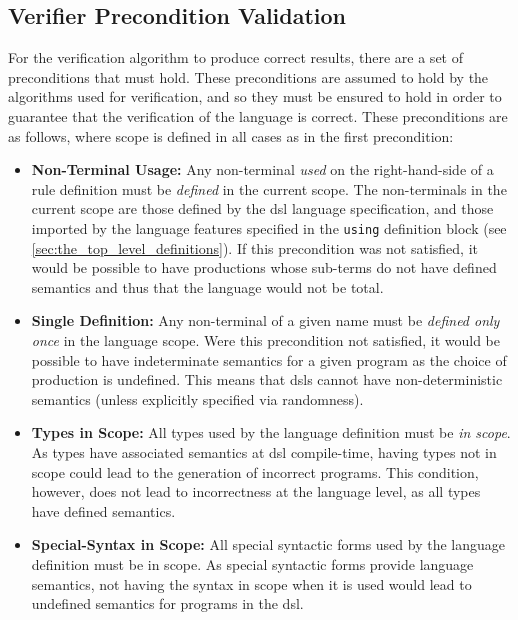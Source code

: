 \subsection{Verifier Precondition Validation} %
\label{sub:verifier_precondition_validation}
For the verification algorithm to produce correct results, there are a set of preconditions that must hold. 
These preconditions are assumed to hold by the algorithms used for verification, and so they must be ensured to hold in order to guarantee that the verification of the language is correct.
These preconditions are as follows, where scope is defined in all cases as in the first precondition:
\begin{itemize}
    \item \label{item:non_terminal_usage} \textbf{Non-Terminal Usage:} Any non-terminal \textit{used} on the right-hand-side of a rule definition must be \textit{defined} in the current scope. 
    The non-terminals in the current scope are those defined by the \gls{dsl} language specification, and those imported by the language features specified in the \texttt{using} definition block (see \autoref{sec:the_top_level_definitions}).
    If this precondition was not satisfied, it would be possible to have productions whose sub-terms do not have defined semantics and thus that the language would not be total. 
    \item \textbf{Single Definition:} Any non-terminal of a given name must be \textit{defined only once} in the language scope.
    Were this precondition not satisfied, it would be possible to have indeterminate semantics for a given program as the choice of production is undefined.
    This means that \glspl{dsl} cannot have non-deterministic semantics (unless explicitly specified via randomness). 
    \item \textbf{Types in Scope:} All types used by the language definition must be \textit{in scope}.
    As types have associated semantics at \gls{dsl} compile-time, having types not in scope could lead to the generation of incorrect programs. 
    This condition, however, does not lead to incorrectness at the language level, as all types have defined semantics.
    \item \textbf{Special-Syntax in Scope:} All special syntactic forms used by the language definition must be in scope.
    As special syntactic forms provide language semantics, not having the syntax in scope when it is used would lead to undefined semantics for programs in the \gls{dsl}. 
\end{itemize}

